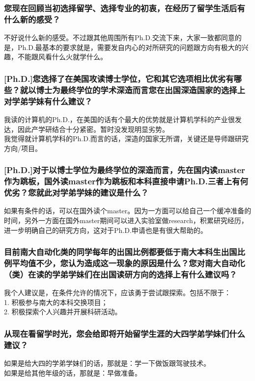 \documentclass[a4paper,UTF8]{book}
\begin{document}
    \subsubsection*{您现在回顾当初选择留学、选择专业的初衷，在经历了留学生活后有什么新的感受？}
    不好说什么新的感受。不过跟其他周围所有Ph.D.交流下来，大家一致都同意的是，Ph.D.最基本的要求就是，需要发自内心的对所研究的问题跟方向有极大的兴趣，不能跟风看什么火就学什么。

    \subsubsection*{[Ph.D.]您选择了在美国攻读博士学位，它和其它选项相比优劣有哪些？就以博士为最终学位的学术深造而言您在出国深造国家的选择上对学弟学妹有什么建议？}
    我读的计算机的Ph.D.，在美国的话有个最大的优势就是计算机学科的产业很发达，因此产学研结合十分紧密。暂时没发现明显劣势。\\
    我觉得就计算机学科的Ph.D.而言的话，深造的国家无所谓，关键还是导师跟研究方向/项目。

    \subsubsection*{[Ph.D.]对于以博士学位为最终学位的深造而言，先在国内读master作为跳板，国外读master作为跳板和本科直接申请Ph.D.三者上有何优劣？您就此对学弟学妹的建议是什么？}
    如果有条件的话，可以在国外读个master。因为一方面可以给自己一个缓冲准备的时间，另外一方面在国外master期间可以进入实验室做research，积累研究经历，进一步明确自己的研究方向，这对于Ph.D.申请也是有很大帮助的。

    \subsubsection*{目前南大自动化类的同学每年的出国比例都要低于南大本科生出国比例平均值不少，您认为造成这一现象的原因是什么？您对南大自动化（类）在读的学弟学妹们在出国读研方向的选择上有什么建议吗？}
    我个人建议是，在条件允许的情况下，应该勇于尝试跟探索。包括不限于：\\1. 积极参与南大的本科交换项目；\\2. 积极探索个人兴趣并开展科研活动。

    \subsubsection*{从现在看留学时光，您会给即将开始留学生涯的大四学弟学妹们什么建议？}
    如果是给大四的学弟学妹们的话，那就是：学一下做饭跟驾驶技术。\\
    如果是给其他年级的话，那就是：早做准备。
\end{document}
